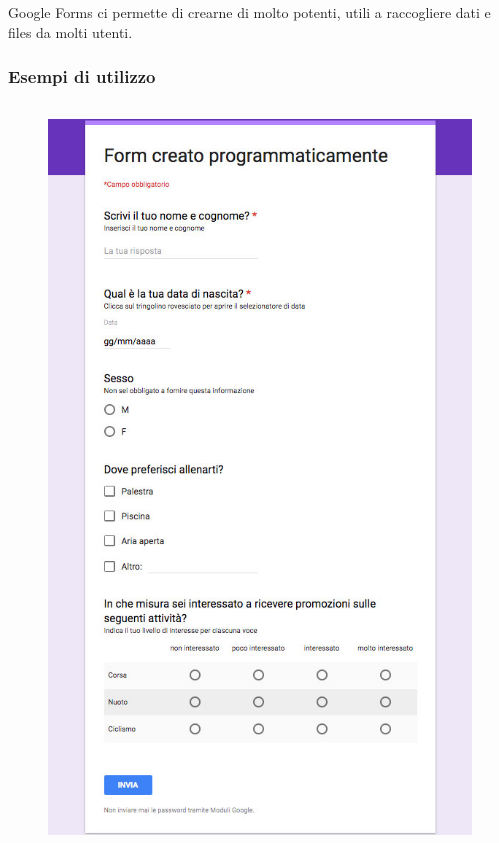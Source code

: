 \documentclass[handout]{beamer}
\begin{document}
\begin{frame}
~


~

\alert{Google Forms} ci permette di crearne di molto potenti, utili a raccogliere dati e files da molti utenti.
\end{frame}


\begin{frame}
\frametitle{Esempi di utilizzo}
\begin{columns}
  \begin{column}{.4\textwidth}
    \begin{figure}
      \includegraphics[width=\columnwidth]{img/form1.jpg}

\end{figure}
\end{column}
\end{columns}
\end{frame}
\end{document}
